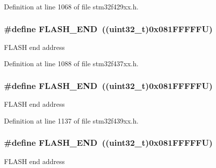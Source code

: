Definition at line 1068 of file stm32f429xx.\+h.

\subsubsection[{\texorpdfstring{F\+L\+A\+S\+H\+\_\+\+E\+ND}{FLASH_END}}]{\setlength{\rightskip}{0pt plus 5cm}\#define F\+L\+A\+S\+H\+\_\+\+E\+ND~((uint32\+\_\+t)0x081\+F\+F\+F\+F\+F\+U)}\hypertarget{group___peripheral__memory__map_ga8be554f354e5aa65370f6db63d4f3ee4}{}\label{group___peripheral__memory__map_ga8be554f354e5aa65370f6db63d4f3ee4}
F\+L\+A\+SH end address 

Definition at line 1088 of file stm32f437xx.\+h.

\subsubsection[{\texorpdfstring{F\+L\+A\+S\+H\+\_\+\+E\+ND}{FLASH_END}}]{\setlength{\rightskip}{0pt plus 5cm}\#define F\+L\+A\+S\+H\+\_\+\+E\+ND~((uint32\+\_\+t)0x081\+F\+F\+F\+F\+F\+U)}\hypertarget{group___peripheral__memory__map_ga8be554f354e5aa65370f6db63d4f3ee4}{}\label{group___peripheral__memory__map_ga8be554f354e5aa65370f6db63d4f3ee4}
F\+L\+A\+SH end address 

Definition at line 1137 of file stm32f439xx.\+h.

\subsubsection[{\texorpdfstring{F\+L\+A\+S\+H\+\_\+\+E\+ND}{FLASH_END}}]{\setlength{\rightskip}{0pt plus 5cm}\#define F\+L\+A\+S\+H\+\_\+\+E\+ND~((uint32\+\_\+t)0x081\+F\+F\+F\+F\+F\+U)}\hypertarget{group___peripheral__memory__map_ga8be554f354e5aa65370f6db63d4f3ee4}{}\label{group___peripheral__memory__map_ga8be554f354e5aa65370f6db63d4f3ee4}
F\+L\+A\+SH end address 

